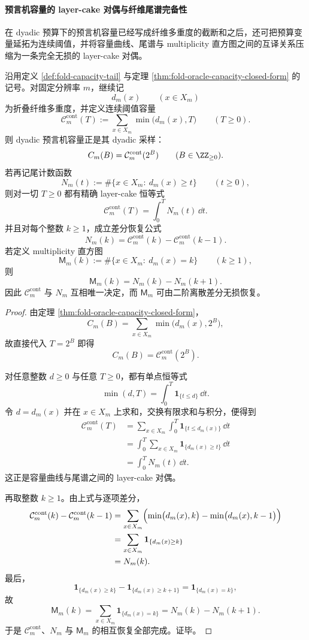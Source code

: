 \paragraph{预言机容量的 layer-cake 对偶与纤维尾谱完备性}
在 dyadic 预算下的预言机容量已经写成纤维多重度的截断和之后，还可把预算变量延拓为连续阈值，并将容量曲线、尾谱与 multiplicity 直方图之间的互译关系压缩为一条完全无损的 layer-cake 对偶。

\begin{theorem}\label{thm:xi-oracle-capacity-layercake-tail-completeness}
沿用定义 \ref{def:fold-capacity-tail} 与定理 \ref{thm:fold-oracle-capacity-closed-form} 的记号。对固定分辨率 \(m\)，继续记
\[
d_m(x)\qquad(x\in X_m)
\]
为折叠纤维多重度，并定义连续阈值容量
\[
\mathcal C_m^{\mathrm{cont}}(T)
:=
\sum_{x\in X_m}\min\bigl(d_m(x),T\bigr)
\qquad(T\ge 0).
\]
则 dyadic 预言机容量正是其 dyadic 采样：
\[
C_m(B)=\mathcal C_m^{\mathrm{cont}}(2^B)
\qquad(B\in\ZZ_{\ge 0}).
\]
若再记尾计数函数
\[
N_m(t):=\#\{x\in X_m:\ d_m(x)\ge t\}
\qquad(t\ge 0),
\]
则对一切 \(T\ge 0\) 都有精确 layer-cake 恒等式
\[
\mathcal C_m^{\mathrm{cont}}(T)=\int_0^T N_m(t)\,\dd t.
\]
并且对每个整数 \(k\ge 1\)，成立差分恢复公式
\[
N_m(k)=\mathcal C_m^{\mathrm{cont}}(k)-\mathcal C_m^{\mathrm{cont}}(k-1).
\]
若定义 multiplicity 直方图
\[
\mathsf M_m(k):=\#\{x\in X_m:\ d_m(x)=k\}
\qquad(k\ge 1),
\]
则
\[
\mathsf M_m(k)=N_m(k)-N_m(k+1).
\]
因此 \(\mathcal C_m^{\mathrm{cont}}\) 与 \(N_m\) 互相唯一决定，而 \(\mathsf M_m\) 可由二阶离散差分无损恢复。
\end{theorem}
\begin{proof}
由定理 \ref{thm:fold-oracle-capacity-closed-form}，
\[
C_m(B)=\sum_{x\in X_m}\min\bigl(d_m(x),2^B\bigr),
\]
故直接代入 \(T=2^B\) 即得
\[
C_m(B)=\mathcal C_m^{\mathrm{cont}}(2^B).
\]

对任意整数 \(d\ge 0\) 与任意 \(T\ge 0\)，都有单点恒等式
\[
\min(d,T)=\int_0^T \mathbf 1_{\{t\le d\}}\,\dd t.
\]
令 \(d=d_m(x)\) 并在 \(x\in X_m\) 上求和，交换有限求和与积分，便得到
\[
\begin{aligned}
\mathcal C_m^{\mathrm{cont}}(T)
&=
\sum_{x\in X_m}\int_0^T \mathbf 1_{\{t\le d_m(x)\}}\,\dd t\\
&=
\int_0^T \sum_{x\in X_m}\mathbf 1_{\{d_m(x)\ge t\}}\,\dd t\\
&=
\int_0^T N_m(t)\,\dd t.
\end{aligned}
\]
这正是容量曲线与尾谱之间的 layer-cake 对偶。

再取整数 \(k\ge 1\)。由上式与逐项差分，
\[
\begin{aligned}
\mathcal C_m^{\mathrm{cont}}(k)-\mathcal C_m^{\mathrm{cont}}(k-1)
&=
\sum_{x\in X_m}
\Bigl(\min\bigl(d_m(x),k\bigr)-\min\bigl(d_m(x),k-1\bigr)\Bigr)\\
&=
\sum_{x\in X_m}\mathbf 1_{\{d_m(x)\ge k\}}\\
&=
N_m(k).
\end{aligned}
\]
最后，
\[
\mathbf 1_{\{d_m(x)\ge k\}}-\mathbf 1_{\{d_m(x)\ge k+1\}}
=
\mathbf 1_{\{d_m(x)=k\}},
\]
故
\[
\mathsf M_m(k)
=
\sum_{x\in X_m}\mathbf 1_{\{d_m(x)=k\}}
=
N_m(k)-N_m(k+1).
\]
于是 \(\mathcal C_m^{\mathrm{cont}}\)、\(N_m\) 与 \(\mathsf M_m\) 的相互恢复全部完成。证毕。
\end{proof}

\endinput
